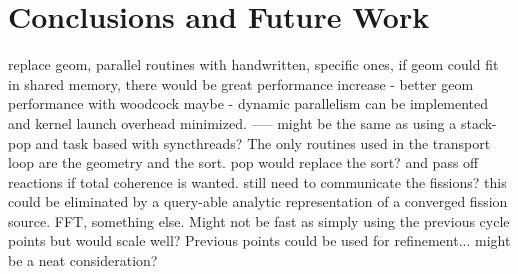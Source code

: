 \chapter{Conclusions and Future Work}
\label{chap:conclusions}

replace geom, parallel routines with handwritten, specific ones, if geom could fit in shared memory, there would be great performance increase
- better geom performance with woodcock maybe
- dynamic parallelism can be implemented and kernel launch overhead minimized.  
-----  might be the same as using a stack-pop and task based with syncthreads?  The only routines used in the transport loop are the geometry and the sort.   pop would replace the sort?  and pass off reactions if total coherence is wanted.  still need to communicate the fissions?  this could be eliminated by a query-able analytic representation of a converged fission source.  FFT, something else.  Might not be fast as simply using the previous cycle points but would scale well?  Previous points could be used for refinement...  might be a neat consideration?